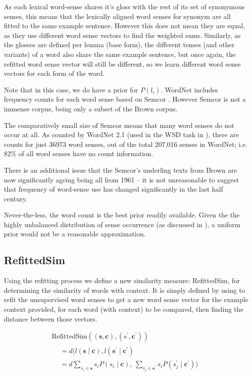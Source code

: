 \documentclass{sig-alternate}
\renewcommand{\c}{\mathbf{c}}
\newcommand{\s}{\mathbf{s}}
\begin{document}
As each lexical word-sense shares it's gloss with the rest of its set of synonymous senses, this means that the lexically aligned word senses for synonym are all fitted to the same example sentence. However this does not mean they are equal, as they use different word sense vectors to find the weighted sums. Similarly, as the glosses are defined per lemma (base form), the different tenses (and other variants) of a word also share the same example sentence, but once again, the refitted word sense vector will still be different, so we learn different word sense vectors for each form of the word.



Note that in this case, we do have a prior for $P(l_i)$.
WordNet includes frequency counts for each word sense based on Semcor \textcite{tengi1998design}.
However Semcor is not a immense corpus, being only a subset of the Brown corpus.

The comparatively small size of Semcor means that many word senses do not occur at all. As counted by WordNet 2.1 (used in the WSD task in ), there are counts for just  36973 word senses, out of the total 207,016 senses in WordNet; i.e. 82\% of all word senses have no count information. 

There is an additional issue that the Semcor's underling texts from Brown are now significantly ageing being all from 1961 \cite{francis1979brown} -- it is not unreasonable to suggest that frequency of word-sense use has changed significantly in the last half century.

Never-the-less, the word count is the best prior readily available. Given the the highly unbalanced distribution of sense occurrence (as discussed in ),
a uniform prior would not be a reasonable approximation.


\subsection{RefittedSim}\label{RefittedSimVsAvgSimC}

Using the refitting process we define a new similarity measure: RefittedSim, for determining the similarity of words with context.
It is simply defined by using  to refit the unsupervised word senses to get a new word sense vector for the example context provided, for each word (with context) to be compared, then finding the distance between those vectors.

\begin{multline} \label{eq:refittedsim}
\mathrm{RefittedSim}((\s,\c),(s^{\prime},\c^{\prime}))\\
\begin{aligned}
&= d(l(\s \mid \c), l(\s^\prime \mid \c^\prime)\\
&= d
\sum_{s_{i}\in\s}s_{i}P(s_{i}\mid\c),\:
\sum_{s_{j}^{\prime}\in\s^{\prime}}s_{i}P(s_{j}^{\prime}\mid\c^{\prime}))
\end{aligned}
\end{multline}
\end{document}
